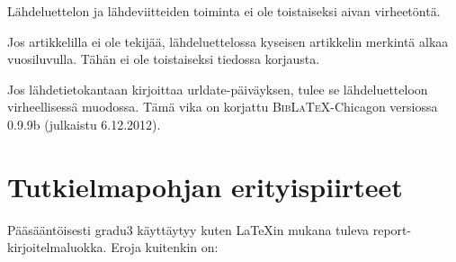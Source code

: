 \documentclass[utf8]{gradu3}
\begin{document}
Lähdeluettelon ja lähdeviitteiden toiminta ei ole toistaiseksi aivan
virheetöntä.

Jos artikkelilla ei ole tekijää, lähdeluettelossa kyseisen artikkelin
merkintä alkaa vuosiluvulla.  Tähän ei ole toistaiseksi tiedossa
korjausta.

Jos lähdetietokantaan kirjoittaa urldate-päiväyksen, tulee se
lähdeluetteloon virheellisessä muodossa.  Tämä vika on korjattu
\textsc{Bib\LaTeX}-Chicagon versiossa 0.9.9b (julkaistu 6.12.2012).

\chapter{Tutkielmapohjan erityispiirteet}

Pääsääntöisesti {gradu3} käyttäytyy kuten \LaTeX in mukana
tuleva {report}-kirjoitelmaluokka.  Eroja kuitenkin on:
\end{document}
